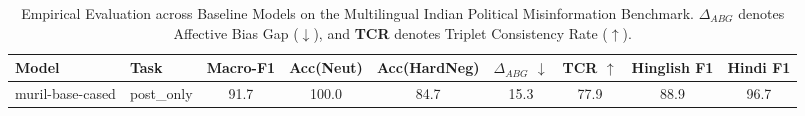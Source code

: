 \begin{table}[t]
\centering
\small
\caption{Empirical Evaluation across Baseline Models on the Multilingual Indian Political Misinformation Benchmark. \textbf{$\Delta_{ABG}$} denotes Affective Bias Gap ($\downarrow$), and \textbf{TCR} denotes Triplet Consistency Rate ($\uparrow$).}
\label{tab:main_results}
\begin{tabular}{llccccccc}
\toprule
\textbf{Model} & \textbf{Task} & \textbf{Macro-F1} & \textbf{Acc(Neut)} & \textbf{Acc(HardNeg)} & \textbf{$\Delta_{ABG}$ $\downarrow$} & \textbf{TCR $\uparrow$} & \textbf{Hinglish F1} & \textbf{Hindi F1} \\
\midrule
muril-base-cased & post_only & 91.7 & 100.0 & 84.7 & 15.3 & 77.9 & 88.9 & 96.7 \\
\bottomrule
\end{tabular}
\end{table}